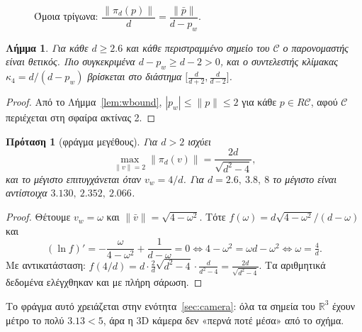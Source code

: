 \documentclass[10pt,a4paper]{article}
\theoremstyle{plain}
\newtheorem{proposition}[theorem]{Πρόταση}
\newtheorem{lemma}[theorem]{Λήμμα}
\theoremstyle{definition}
\newcommand{\R}{\mathbb{R}}
\newcommand{\C}{\mathcal{C}}
\begin{document}
\begin{figure}[h]
\centering
{}
\caption{Όμοια τρίγωνα: $\dfrac{\|\pi_d(p)\|}{d}=\dfrac{\|\bar p\|}{d-p_w}$.}
\label{fig:persp}
\end{figure}

\begin{lemma}\label{lem:welldef}
Για κάθε $d\ge2.6$ και κάθε περιστραμμένο σημείο του $\C$ ο παρονομαστής είναι θετικός. Πιο συγκεκριμένα $d-p_w\ge d-2>0$, και ο συντελεστής κλίμακας $\kappa_4=d/(d-p_w)$ βρίσκεται στο διάστημα $\bigl[\tfrac{d}{d+2},\tfrac{d}{d-2}\bigr]$.
\end{lemma}
\begin{proof}
Από το Λήμμα~\ref{lem:wbound}, $|p_w|\le\|p\|\le2$ για κάθε $p\in R\C$, αφού $\C$ περιέχεται στη σφαίρα ακτίνας 2.
\end{proof}

\begin{proposition}[φράγμα μεγέθους]\label{prop:size}
Για $d>2$ ισχύει
\[
\max_{\|v\|=2}\|\pi_d(v)\|=\frac{2d}{\sqrt{d^2-4}},
\]
και το μέγιστο επιτυγχάνεται όταν $v_w=4/d$. Για $d=2.6,\ 3.8,\ 8$ το μέγιστο είναι αντίστοιχα $3.130,\ 2.352,\ 2.066$.
\end{proposition}
\begin{proof}
Θέτουμε $v_w=\omega$ και $\|\bar v\|=\sqrt{4-\omega^2}$. Τότε $f(\omega)=d\sqrt{4-\omega^2}/(d-\omega)$ και
\[
(\ln f)'=-\frac{\omega}{4-\omega^2}+\frac{1}{d-\omega}=0\iff 4-\omega^2=\omega d-\omega^2\iff \omega=\tfrac4d .
\]
Με αντικατάσταση: $f(4/d)=d\cdot\frac2d\sqrt{d^2-4}\cdot\frac{d}{d^2-4}=\frac{2d}{\sqrt{d^2-4}}$. Τα αριθμητικά δεδομένα ελέγχθηκαν και με πλήρη σάρωση.
\end{proof}
Το φράγμα αυτό χρειάζεται στην ενότητα~\ref{sec:camera}: όλα τα σημεία του $\R^3$ έχουν μέτρο το πολύ $3.13<5$, άρα η 3D κάμερα δεν «περνά ποτέ μέσα» από το σχήμα.
\end{document}
